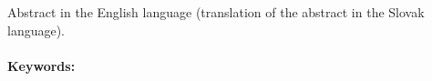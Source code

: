 \documentclass[12pt, oneside]{book}  %
\begin{document}
Abstract in the English language (translation of the abstract in the
Slovak language).


\paragraph*{Keywords:} 


%
%
%




\cleardoublepage
\tableofcontents



\listoffigures
\listoftables


\mainmatter
\pagestyle{headings}


 









\newpage	

\backmatter

\thispagestyle{empty}
\clearpage
{}

 



%



\end{document}
